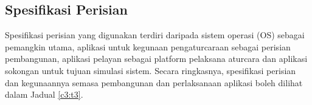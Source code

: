 \begin{table}[H]
	\newline \newline
    \caption[Spesifikasi Perkakasan Terbenam Sasaran]{Spesifikasi Perkakasan Terbenam Sasaran}
    \label{c3:t2}
\end{table}

\subsection{Spesifikasi Perisian}
Spesifikasi perisian yang digunakan terdiri daripada sistem operasi (OS) sebagai pemangkin utama, aplikasi untuk kegunaan pengaturcaraan sebagai perisian pembangunan, aplikasi pelayan sebagai platform pelaksana aturcara dan aplikasi sokongan untuk tujuan simulasi sistem. Secara ringkasnya, spesifikasi perisian dan kegunaannya semasa pembangunan dan perlaksanaan aplikasi boleh dilihat dalam Jadual \ref{c3:t3}.

